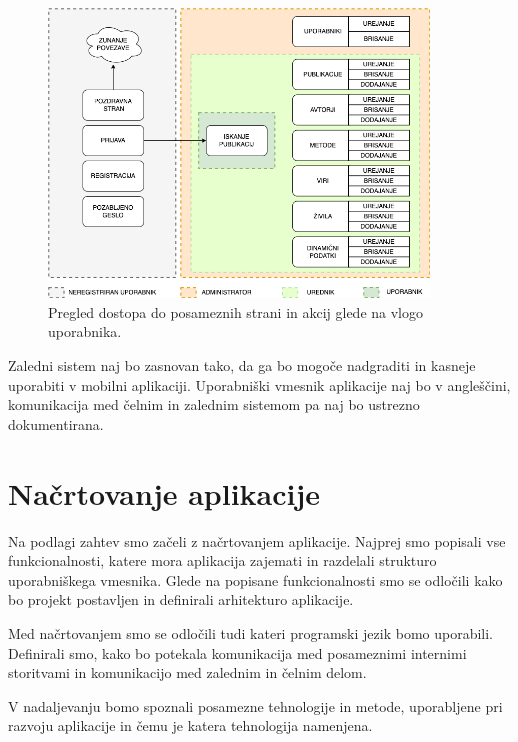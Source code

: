\documentclass[a4paper, 12pt]{book}
\begin{document}
\begin{figure}[h]
\begin{center}
\includegraphics[width=0.9\textwidth]{slike/user_hierarchy.png}
\end{center}
\caption{ Pregled dostopa do posameznih strani in akcij glede na vlogo uporabnika. }
\label{user-rights}
\end{figure}

Zaledni sistem naj bo zasnovan tako, da ga bo mogoče nadgraditi in kasneje uporabiti v mobilni aplikaciji. Uporabniški vmesnik aplikacije naj bo v angleščini, komunikacija med čelnim in zalednim sistemom pa naj bo ustrezno dokumentirana.

\clearpage


\section{Načrtovanje aplikacije}
\label{nacrtovanje}

Na podlagi zahtev smo začeli z načrtovanjem aplikacije. Najprej smo popisali vse funkcionalnosti, katere mora aplikacija zajemati in razdelali strukturo uporabniškega vmesnika. Glede na popisane funkcionalnosti smo se odločili kako bo projekt postavljen in definirali arhitekturo aplikacije.

Med načrtovanjem smo se odločili tudi kateri programski jezik bomo uporabili. Definirali smo, kako bo potekala komunikacija med posameznimi internimi storitvami in komunikacijo med zalednim in čelnim delom.

V nadaljevanju bomo spoznali posamezne tehnologije in metode, uporabljene pri razvoju aplikacije in čemu je katera tehnologija namenjena.
\end{document}

